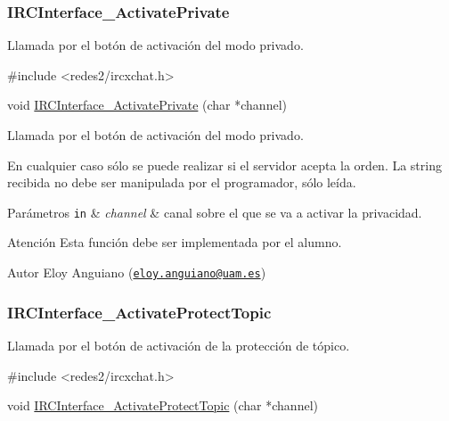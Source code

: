  \hypertarget{IRCInterface_ActivatePrivate}{}\subsubsection{I\+R\+C\+Interface\+\_\+\+Activate\+Private}\label{IRCInterface_ActivatePrivate}
Llamada por el botón de activación del modo privado.


\begin{DoxyCode}
\textcolor{preprocessor}{#include <redes2/ircxchat.h>}

\textcolor{keywordtype}{void} \hyperlink{G-2313-06-P2__client_8c_ab1f09c737c7c109a97e22de6072d731d}{IRCInterface\_ActivatePrivate} (\textcolor{keywordtype}{char} *channel)
\end{DoxyCode}


Llamada por el botón de activación del modo privado.

En cualquier caso sólo se puede realizar si el servidor acepta la orden. La string recibida no debe ser manipulada por el programador, sólo leída.


\begin{DoxyParams}[1]{Parámetros}
\mbox{\tt in}  & {\em channel} & canal sobre el que se va a activar la privacidad.\\
\hline
\end{DoxyParams}
\begin{DoxyWarning}{Atención}
Esta función debe ser implementada por el alumno.
\end{DoxyWarning}
\begin{DoxyAuthor}{Autor}
Eloy Anguiano (\href{mailto:eloy.anguiano@uam.es}{\tt eloy.\+anguiano@uam.\+es})
\end{DoxyAuthor}


 \hypertarget{IRCInterface_ActivateProtectTopic}{}\subsubsection{I\+R\+C\+Interface\+\_\+\+Activate\+Protect\+Topic}\label{IRCInterface_ActivateProtectTopic}
Llamada por el botón de activación de la protección de tópico.


\begin{DoxyCode}
\textcolor{preprocessor}{#include <redes2/ircxchat.h>}

\textcolor{keywordtype}{void} \hyperlink{G-2313-06-P2__client_8c_ac45f12d4dcacf3b5485eec6fdc51df93}{IRCInterface\_ActivateProtectTopic} (\textcolor{keywordtype}{char} *channel)
\end{DoxyCode}


